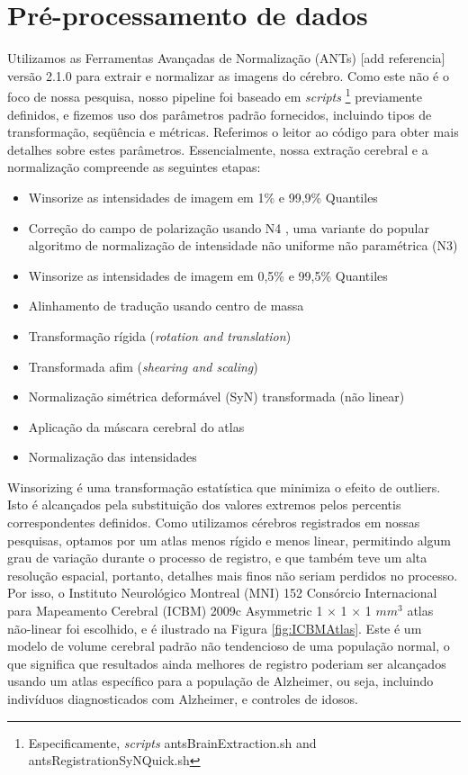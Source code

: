 \documentclass[openright]{UFRGS} %
\begin{document}
\section{Pré-processamento de dados}
Utilizamos as Ferramentas Avançadas de Normalização (ANTs) [add referencia] versão 2.1.0 para extrair e normalizar as imagens do cérebro. Como este não é o foco de nossa pesquisa, nosso pipeline foi baseado em \textit{scripts} \footnote[1]{Especificamente,  \textit{scripts} antsBrainExtraction.sh and antsRegistrationSyNQuick.sh}
 previamente definidos, e fizemos uso dos parâmetros padrão fornecidos,
incluindo tipos de transformação, seqüência e métricas. Referimos o leitor ao código
para obter mais detalhes sobre estes parâmetros. Essencialmente, nossa extração cerebral e a normalização compreende as seguintes etapas:

\begin{itemize}
\item Winsorize as intensidades de imagem em 1\% e 99,9\% Quantiles
\item Correção do campo de polarização usando N4 , uma variante do popular algoritmo de normalização de intensidade não uniforme não paramétrica (N3)

\item Winsorize as intensidades de imagem em 0,5\% e 99,5\% Quantiles
\item Alinhamento de tradução usando centro de massa
\item Transformação rígida (\textit{rotation and translation})
\item Transformada afim (\textit{shearing and scaling})
\item Normalização simétrica deformável (SyN) transformada (não linear)
\item Aplicação da máscara cerebral do atlas
\item  Normalização das intensidades 

\end{itemize}

Winsorizing é uma transformação estatística que minimiza o efeito de outliers. Isto é
alcançados pela substituição dos valores extremos pelos percentis correspondentes definidos. Como
utilizamos cérebros registrados em nossas pesquisas, optamos por um atlas menos rígido e menos linear,
permitindo algum grau de variação durante o processo de registro, e que também teve um
alta resolução espacial, portanto, detalhes mais finos não seriam perdidos no processo. Por isso, o
Instituto Neurológico Montreal (MNI) 152 Consórcio Internacional para Mapeamento Cerebral
(ICBM) 2009c Asymmetric 1 × 1 × 1 $mm^3$ atlas não-linear foi escolhido, e é
ilustrado na Figura \ref{fig:ICBMAtlas}. Este é um modelo de volume cerebral padrão não tendencioso de
uma população normal, o que significa que resultados ainda melhores de registro poderiam ser alcançados 
usando um atlas específico para a população de Alzheimer, ou seja, incluindo indivíduos diagnosticados com Alzheimer, e controles de idosos. 
\end{document}
